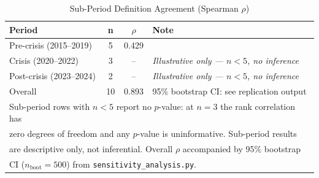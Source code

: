 \begin{table}[ht]
\caption{Sub-Period Definition Agreement (Spearman $\rho$)}
\label{tab:spearman_subperiod}
\footnotesize
\begin{tabular}{lccl}
\toprule
\textbf{Period} & \textbf{n} & \textbf{$\rho$} & \textbf{Note}\\
\midrule
Pre-crisis (2015--2019) & 5 & 0.429 & \\
Crisis (2020--2022) & 3 & -- & \textit{Illustrative only --- $n < 5$, no inference}\\
Post-crisis (2023--2024) & 2 & -- & \textit{Illustrative only --- $n < 5$, no inference}\\
\midrule
Overall & 10 & 0.893 & 95\% bootstrap CI: see replication output\\
\bottomrule
\multicolumn{4}{l}{\scriptsize Sub-period rows with $n<5$ report no $p$-value: at $n=3$ the rank correlation has}\\
\multicolumn{4}{l}{\scriptsize zero degrees of freedom and any $p$-value is uninformative. Sub-period results}\\
\multicolumn{4}{l}{\scriptsize are descriptive only, not inferential. Overall $\rho$ accompanied by 95\% bootstrap}\\
\multicolumn{4}{l}{\scriptsize CI ($n_{\text{boot}}=500$) from \texttt{sensitivity\_analysis.py}.}\\
\end{tabular}
\end{table}
